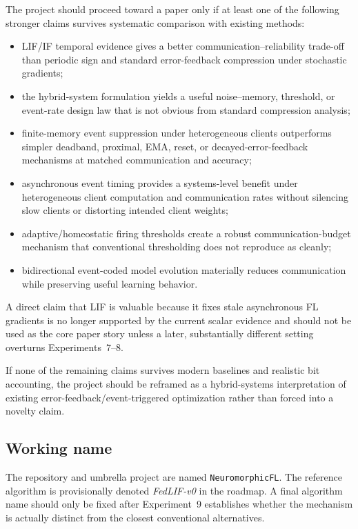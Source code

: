 The project should proceed toward a paper only if at least one of the following stronger claims survives systematic comparison with existing methods:
\begin{itemize}
  \item LIF/IF temporal evidence gives a better communication--reliability trade-off than periodic sign and standard error-feedback compression under stochastic gradients;
  \item the hybrid-system formulation yields a useful noise--memory, threshold, or event-rate design law that is not obvious from standard compression analysis;
  \item finite-memory event suppression under heterogeneous clients outperforms simpler deadband, proximal, EMA, reset, or decayed-error-feedback mechanisms at matched communication and accuracy;
  \item asynchronous event timing provides a systems-level benefit under heterogeneous client computation and communication rates without silencing slow clients or distorting intended client weights;
  \item adaptive/homeostatic firing thresholds create a robust communication-budget mechanism that conventional thresholding does not reproduce as cleanly;
  \item bidirectional event-coded model evolution materially reduces communication while preserving useful learning behavior.
\end{itemize}

A direct claim that LIF is valuable because it fixes stale asynchronous FL gradients is no longer supported by the current scalar evidence and should not be used as the core paper story unless a later, substantially different setting overturns Experiments~7--8.

If none of the remaining claims survives modern baselines and realistic bit accounting, the project should be reframed as a hybrid-systems interpretation of existing error-feedback/event-triggered optimization rather than forced into a novelty claim.

\subsection{Working name}

The repository and umbrella project are named \texttt{NeuromorphicFL}. The reference algorithm is provisionally denoted \emph{FedLIF-v0} in the roadmap. A final algorithm name should only be fixed after Experiment~9 establishes whether the mechanism is actually distinct from the closest conventional alternatives.
